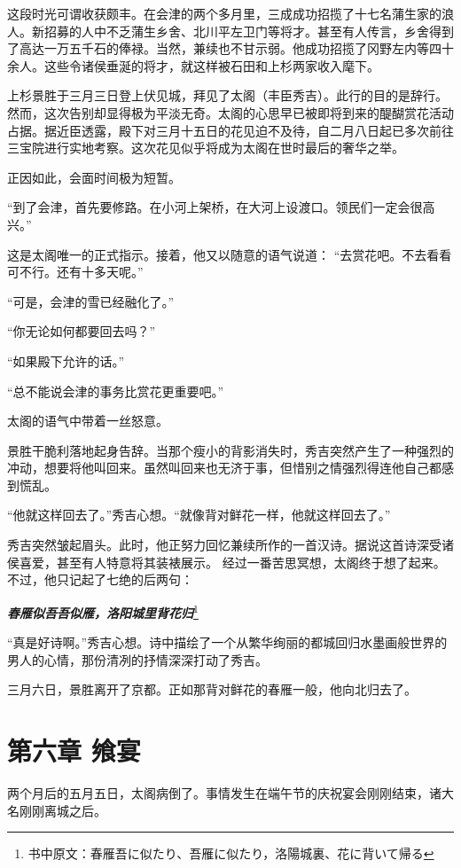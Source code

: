 \documentclass[
]{article}
\begin{document}
这段时光可谓收获颇丰。在会津的两个多月里，三成成功招揽了十七名蒲生家的浪人。新招募的人中不乏蒲生乡舍、北川平左卫门等将才。甚至有人传言，乡舍得到了高达一万五千石的俸禄。当然，兼续也不甘示弱。他成功招揽了冈野左内等四十余人。这些令诸侯垂涎的将才，就这样被石田和上杉两家收入麾下。

上杉景胜于三月三日登上伏见城，拜见了太阁（丰臣秀吉）。此行的目的是辞行。然而，这次告别却显得极为平淡无奇。太阁的心思早已被即将到来的醍醐赏花活动占据。据近臣透露，殿下对三月十五日的花见迫不及待，自二月八日起已多次前往三宝院进行实地考察。这次花见似乎将成为太阁在世时最后的奢华之举。

正因如此，会面时间极为短暂。

``到了会津，首先要修路。在小河上架桥，在大河上设渡口。领民们一定会很高兴。''

这是太阁唯一的正式指示。接着，他又以随意的语气说道：
``去赏花吧。不去看看可不行。还有十多天呢。''

``可是，会津的雪已经融化了。''

``你无论如何都要回去吗？''

``如果殿下允许的话。''

``总不能说会津的事务比赏花更重要吧。''

太阁的语气中带着一丝怒意。

景胜干脆利落地起身告辞。当那个瘦小的背影消失时，秀吉突然产生了一种强烈的冲动，想要将他叫回来。虽然叫回来也无济于事，但惜别之情强烈得连他自己都感到慌乱。

``他就这样回去了。''秀吉心想。``就像背对鲜花一样，他就这样回去了。''

秀吉突然皱起眉头。此时，他正努力回忆兼续所作的一首汉诗。据说这首诗深受诸侯喜爱，甚至有人特意将其装裱展示。
经过一番苦思冥想，太阁终于想了起来。不过，他只记起了七绝的后两句：

\textbf{\emph{春雁似吾吾似雁，洛阳城里背花归}}\footnote{书中原文：春雁吾に似たり、吾雁に似たり，洛陽城裏、花に背いて帰る}

``真是好诗啊。''秀吉心想。诗中描绘了一个从繁华绚丽的都城回归水墨画般世界的男人的心情，那份清冽的抒情深深打动了秀吉。

三月六日，景胜离开了京都。正如那背对鲜花的春雁一般，他向北归去了。

\section*{第六章 飨宴}\label{ux7b2cux516dux7ae0-ux98e8ux5bb4}

两个月后的五月五日，太阁病倒了。事情发生在端午节的庆祝宴会刚刚结束，诸大名刚刚离城之后。
\end{document}
